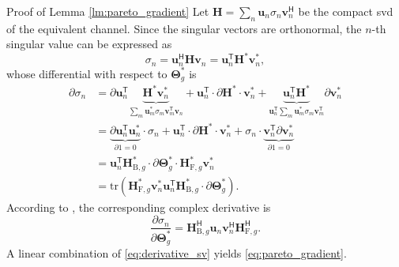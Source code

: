 \documentclass[journal]{IEEEtran}
\begin{document}
\begin{appendix}
	\begin{subsection}{Proof of Lemma \ref{lm:pareto_gradient}}\label{ap:pareto_gradient}
		Let $\mathbf{H} = \sum_n \mathbf{u}_n \sigma_n \mathbf{v}_n^\mathsf{H}$ be the compact \gls{svd} of the equivalent channel.
		Since the singular vectors are orthonormal, the $n$-th singular value can be expressed as
		\begin{equation}
			\sigma_n = \mathbf{u}_n^\mathsf{H} \mathbf{H} \mathbf{v}_n = \mathbf{u}_n^\mathsf{T} \mathbf{H}^* \mathbf{v}_n^*,
		\end{equation}
		whose differential with respect to $\mathbf{\Theta}_g^*$ is
		\begin{align*}
			\partial \sigma_n
			 & = \partial \mathbf{u}_n^\mathsf{T} \underbrace{\mathbf{H}^* \mathbf{v}_n^*}_{\sum_m \mathbf{u}_m^* \sigma_m \mathbf{v}_m^\mathsf{T} \mathbf{v}_n} + \mathbf{u}_n^\mathsf{T} \cdot \partial \mathbf{H}^* \cdot \mathbf{v}_n^* + \underbrace{\mathbf{u}_n^\mathsf{T} \mathbf{H}^*}_{\mathbf{u}_n^\mathsf{T} \sum_m \mathbf{u}_m^* \sigma_m \mathbf{v}_m^\mathsf{T}} \partial \mathbf{v}_n^* \\
			 & = \underbrace{\partial \mathbf{u}_n^\mathsf{T} \mathbf{u}_n^*}_{\partial 1 = 0} \cdot \sigma_n + \mathbf{u}_n^\mathsf{T} \cdot \partial \mathbf{H}^* \cdot \mathbf{v}_n^* + \sigma_n \cdot \underbrace{\mathbf{v}_n^\mathsf{T} \partial \mathbf{v}_n^*}_{\partial 1 = 0}                                                                                                                  \\
			 & = \mathbf{u}_n^\mathsf{T} \mathbf{H}_{\mathrm{B},g}^* \cdot \partial \mathbf{\Theta}_g^* \cdot \mathbf{H}_{\mathrm{F},g}^* \mathbf{v}_n^*                                                                                                                                                                                                                                                 \\
			 & = \mathrm{tr}(\mathbf{H}_{\mathrm{F},g}^* \mathbf{v}_n^*\mathbf{u}_n^\mathsf{T} \mathbf{H}_{\mathrm{B},g}^* \cdot \partial \mathbf{\Theta}_g^*).
		\end{align*}
		According to \cite{Hjorungnes2007}, the corresponding complex derivative is
		\begin{equation}
			\frac{\partial \sigma_n}{\partial \mathbf{\Theta}_g^*} = \mathbf{H}_{\mathrm{B},g}^\mathsf{H} \mathbf{u}_n \mathbf{v}_n^\mathsf{H} \mathbf{H}_{\mathrm{F},g}^\mathsf{H}.
			\label{eq:derivative_sv}
		\end{equation}
		A linear combination of \eqref{eq:derivative_sv} yields \eqref{eq:pareto_gradient}.
	\end{subsection}


\end{appendix}
\end{document}
